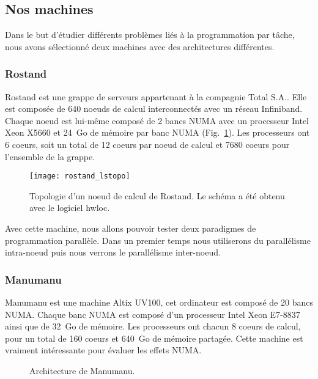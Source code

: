 \subsection{Nos machines}
Dans le but d'étudier différents problèmes liés à la programmation par tâche, nous avons sélectionné deux machines avec des architectures différentes.

\subsubsection{Rostand}
Rostand est une grappe de serveurs appartenant à la compagnie Total S.A..
%
Elle est composée de 640 noeuds de calcul interconnectés avec un réseau Infiniband.
%
Chaque noeud est lui-même composé de 2 bancs NUMA avec un processeur Intel Xeon X5660 et 24~Go de mémoire par banc NUMA (Fig.~\ref{fig:rostand}).
%
Les processeurs ont 6 coeurs, soit un total de 12 coeurs par noeud de calcul et 7680 coeurs pour l'ensemble de la grappe.

\begin{figure}[!ht]
        \centering
        \texttt{[image: rostand\_lstopo]}
        \caption{Topologie d'un noeud de calcul de Rostand. Le schéma a été obtenu avec le logiciel hwloc.}
        \label{fig:rostand}
\end{figure}

Avec cette machine, nous allons pouvoir tester deux paradigmes de programmation parallèle.
%
Dans un premier temps nous utiliserons du parallélisme intra-noeud puis nous verrons le parallélisme inter-noeud.

\subsubsection{Manumanu}
Manumanu est une machine Altix UV100, cet ordinateur est composé de 20 bancs NUMA.
%
Chaque banc NUMA est composé d'un processeur Intel Xeon E7-8837 ainsi que de 32~Go de mémoire.
%
Les processeurs ont chacun 8 coeurs de calcul, pour un total de 160 coeurs et 640~Go de mémoire partagée.
%
Cette machine est vraiment intéressante pour évaluer les effets NUMA.

\begin{figure}[!ht]
     \begin{center}
    \end{center}
    \caption{Architecture de Manumanu.}
    \label{fig:manumanu}
\end{figure}

